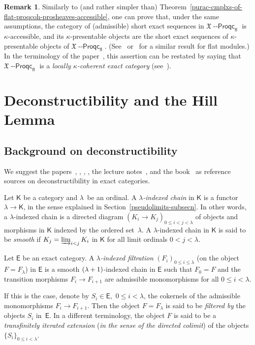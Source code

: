 \documentclass[12pt,a4paper]{amsart}
\newcommand{\+}{\protect\nobreakdash-}
\renewcommand{\:}{\colon}
\newcommand{\rarrow}{\longrightarrow}
\newcommand{\Proqc}{{\operatorname{\mathsf{--Proqc}}}}
\newcommand{\fl}{\mathsf{fl}}
\newcommand{\sE}{\mathsf E}
\newcommand{\sK}{\mathsf K}
\newcommand{\fX}{\mathfrak X}
\newcommand{\Section}[1]{\bigskip\section{#1}\medskip}
\theoremstyle{plain}
\theoremstyle{definition}
\newtheorem{rem}[thm]{Remark}
\begin{document}
\begin{rem}
 Similarly to (and rather simpler than)
Theorem~\ref{purac-cmplxs-of-flat-proqcoh-prosheaves-accessible},
one can prove that, under the same assumptions, the category of
(admissible) short exact sequences in $\fX\Proqc_\fl$ is
$\kappa$\+accessible, and its $\kappa$\+presentable objects are
the short exact sequences of $\kappa$\+presentable objects of
$\fX\Proqc_\fl$.
 (See~\cite[Corollary~10.13]{Pacc} or~\cite[Proposition~4.6]{Plce}
for a similar result for flat modules.)
 In the terminology of the paper~\cite{Plce}, this assertion can be
restated by saying that $\fX\Proqc_\fl$ is a \emph{locally\/
$\kappa$\+coherent exact category} (see~\cite[proof of
Lemma~1.2]{Plce}).
\end{rem}


\Section{Deconstructibility and the Hill Lemma}
\label{deconstructibility-secn}

\subsection{Background on deconstructibility}
 We suggest the papers~\cite[Sections~1\+-2]{SaoSt},
\cite[Section~4]{PR}, \cite[Section~7]{PS6}, \cite[Section~1]{Pfltp},
the lecture notes~\cite[Section~3]{Sto-ICRA}, and
the book~\cite[Section~B.2]{Pcosh} as reference sources on
deconstructibility in exact categories.

 Let $\sK$ be a category and $\lambda$~be an ordinal.
 A \emph{$\lambda$\+indexed chain} in $\sK$ is a functor
$\lambda\rarrow\sK$, in the sense explained in
Section~\ref{pseudolimits-subsecn}.
 In other words, a $\lambda$\+indexed chain is a directed diagram
$(K_i\to K_j)_{0\le i<j<\lambda}$ of objects and morphisms in $\sK$
indexed by the ordered set~$\lambda$.
 A $\lambda$\+indexed chain in $\sK$ is said to be \emph{smooth} if
$K_j=\varinjlim_{i<j}K_i$ in $\sK$ for all limit ordinals $0<j<\lambda$.

 Let $\sE$ be an exact category.
 A \emph{$\lambda$\+indexed filtration} $(F_i)_{0\le i\le\lambda}$
(on the object $F=F_\lambda$) in $\sE$ is a smooth
$(\lambda+\nobreak1)$\+indexed chain in $\sE$ such that $F_0=F$
and the transition morphisms $F_i\rarrow F_{i+1}$ are admissible
monomorphisms for all $0\le i<\lambda$.

 If this is the case, denote by $S_i\in\sE$, \,$0\le i<\lambda$,
the cokernels of the admissible monomorphisms $F_i\rarrow F_{i+1}$.
 Then the object $F=F_\lambda$ is said to be \emph{filtered by}
the objects $S_i$ in~$\sE$.
 In a different terminology, the object $F$ is said to be
a \emph{transfinitely iterated extension} (\emph{in the sense of
the directed colimit}) of the objects $\{S_i\}_{0\le i<\lambda}$.
\end{document}
